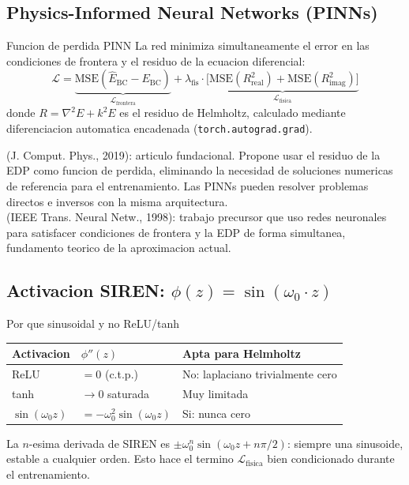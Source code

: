 \documentclass[12pt,a4paper]{article}
\newcommand{\code}[1]{\texttt{\color{azulujat}#1}}
\begin{document}
\subsection{Physics-Informed Neural Networks (PINNs)}

\begin{definbox}{Funcion de perdida PINN}
La red minimiza simultaneamente el error en las condiciones de frontera y el
residuo de la ecuacion diferencial:
\[
  \mathcal{L} = \underbrace{\mathrm{MSE}(\hat{E}_\text{BC} - E_\text{BC})}_{
    \mathcal{L}_\text{frontera}}
  + \lambda_\text{fis} \cdot \underbrace{\bigl[
    \mathrm{MSE}(R_\text{real}^2) + \mathrm{MSE}(R_\text{imag}^2)
  \bigr]}_{\mathcal{L}_\text{fisica}}
\]
donde $R = \nabla^2 E + k^2 E$ es el residuo de Helmholtz, calculado mediante
diferenciacion automatica encadenada (\code{torch.autograd.grad}).
\end{definbox}

\begin{litbox}
\textbf{\textcite{raissi2019}} (J. Comput. Phys., 2019): articulo fundacional.
Propone usar el residuo de la EDP como funcion de perdida, eliminando la necesidad
de soluciones numericas de referencia para el entrenamiento. Las PINNs pueden
resolver problemas directos e inversos con la misma arquitectura.\\[4pt]
\textbf{\textcite{lagaris1998}} (IEEE Trans. Neural Netw., 1998): trabajo precursor
que uso redes neuronales para satisfacer condiciones de frontera y la EDP de forma
simultanea, fundamento teorico de la aproximacion actual.
\end{litbox}

\subsection{Activacion SIREN: $\phi(z) = \sin(\omega_0 \cdot z)$}

\begin{definbox}{Por que sinusoidal y no ReLU/tanh}
\begin{tabular}{lll}
\toprule
Activacion & $\phi''(z)$ & Apta para Helmholtz \\
\midrule
ReLU        & $= 0$ (c.t.p.) & No: laplaciano trivialmente cero \\
tanh        & $\to 0$ saturada & Muy limitada \\
$\sin(\omega_0 z)$ & $= -\omega_0^2\sin(\omega_0 z)$ & Si: nunca cero \\
\bottomrule
\end{tabular}

\vspace{4pt}
La $n$-esima derivada de SIREN es $\pm\omega_0^n\sin(\omega_0 z + n\pi/2)$:
siempre una sinusoide, estable a cualquier orden. Esto hace el termino
$\mathcal{L}_\text{fisica}$ bien condicionado durante el entrenamiento.
\end{definbox}
\end{document}
